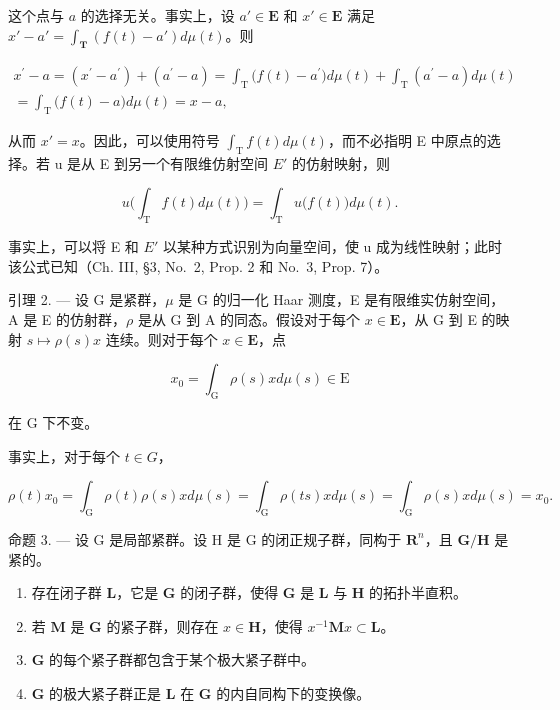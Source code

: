 这个点与 \(a\) 的选择无关。事实上，设 \(a' \in \mathbf{E}\) 和 \(x' \in \mathbf{E}\) 满足 \(x' - a' = \int_{\mathbf{T}} (f(t) - a') d\mu(t)\)。则

\[
\begin{array}{c} x ^ {\prime} - a = (x ^ {\prime} - a ^ {\prime}) + (a ^ {\prime} - a) = \int_ {\mathrm{T}} \bigl (f (t) - a ^ {\prime} \bigr) d \mu (t) + \int_ {\mathrm{T}} (a ^ {\prime} - a) d \mu (t) \\ = \int_ {\mathrm{T}} \bigl (f (t) - a \bigr) d \mu (t) = x - a, \end{array}
\]

从而 \(x' = x\)。因此，可以使用符号 \(\int_{\mathrm{T}} f(t) d\mu(t)\)，而不必指明 E 中原点的选择。若 u 是从 E 到另一个有限维仿射空间 \(E'\) 的仿射映射，则

\[
u \Big (\int_ {\mathrm{T}} f (t) d \mu (t) \Big) = \int_ {\mathrm{T}} u \big (f (t) \big) d \mu (t).
\]

事实上，可以将 E 和 \(E'\) 以某种方式识别为向量空间，使 u 成为线性映射；此时该公式已知（Ch. III, §3, No.~2, Prop. 2 和 No.~3, Prop. 7）。

引理 2. --- 设 G 是紧群，\(\mu\) 是 G 的归一化 Haar 测度，E 是有限维实仿射空间，A 是 E 的仿射群，\(\rho\) 是从 G 到 A 的同态。假设对于每个 \(x \in \mathbf{E}\)，从 G 到 E 的映射 \(s \mapsto \rho(s)x\) 连续。则对于每个 \(x \in \mathbf{E}\)，点

\[
x _ {0} = \int_ {\mathrm{G}} \rho (s) x d \mu (s) \in \mathrm{E}
\]

在 G 下不变。

事实上，对于每个 \(t \in G\)，

\[
\rho (t) x _ {0} = \int_ {\mathrm{G}} \rho (t) \rho (s) x d \mu (s) = \int_ {\mathrm{G}} \rho (t s) x d \mu (s) = \int_ {\mathrm{G}} \rho (s) x d \mu (s) = x _ {0}.
\]

命题 3. --- 设 G 是局部紧群。设 H 是 G 的闭正规子群，同构于 \(\mathbf{R}^n\)，且 \(\mathbf{G} / \mathbf{H}\) 是紧的。

\begin{enumerate}
\def\labelenumi{\alph{enumi})}
\item
  存在闭子群 \(\mathbf{L}\)，它是 \(\mathbf{G}\) 的闭子群，使得 \(\mathbf{G}\) 是 \(\mathbf{L}\) 与 \(\mathbf{H}\) 的拓扑半直积。
\item
  若 \(\mathbf{M}\) 是 \(\mathbf{G}\) 的紧子群，则存在 \(x \in \mathbf{H}\)，使得 \(x^{-1}\mathbf{M}x \subset \mathbf{L}\)。
\item
  \(\mathbf{G}\) 的每个紧子群都包含于某个极大紧子群中。
\item
  \(\mathbf{G}\) 的极大紧子群正是 \(\mathbf{L}\) 在 \(\mathbf{G}\) 的内自同构下的变换像。
\end{enumerate}

